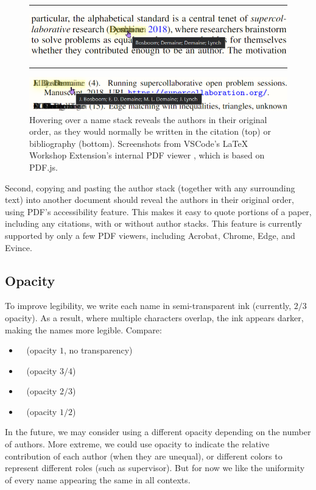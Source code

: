 \documentclass[natbib,authoryear]{sigtbd17-style}
\begin{document}
\begin{figure}[htbp]
  \centering
  \hrule

  \includegraphics[scale=0.5]{figs/tooltip-text.png}

  \hrule

  \includegraphics[scale=0.5]{figs/tooltip-bib.png}
  \caption{Hovering over a name stack reveals the authors in their original
    order, as they would normally be written in the citation (top)
    or bibliography (bottom).  Screenshots from
    VSCode's LaTeX Workshop Extension's internal PDF viewer
    \cite{latex-workshop-pdf}, which is based on PDF.js.}
  \label{fig:tooltip}
\end{figure}

Second, copying and pasting the author stack (together with any surrounding
text) into another document should reveal the authors in their original order,
using PDF's accessibility feature.
This makes it easy to quote portions of a paper,
including any citations, with or without author stacks.
This feature is currently supported by only a few PDF viewers,
including Acrobat, Chrome, Edge, and Evince.

\subsection{Opacity}

To improve legibility, we write each name in semi-transparent ink
(currently, $2/3$ opacity).
As a result, where multiple characters overlap, the ink appears darker,
making the names more legible.  Compare:
%
\begin{itemize}
\item {} ~ (opacity $1$, no transparency)
\item {} ~ (opacity $3/4$)
\item {} ~ (opacity $2/3$)
\item {} ~ (opacity $1/2$)
\end{itemize}
%
In the future, we may consider using a different opacity depending on the
number of authors.  More extreme, we could use opacity to indicate the
relative contribution of each author (when they are unequal), or different
colors to represent different roles (such as supervisor).
But for now we like the uniformity of every name
appearing the same in all contexts.
\end{document}
